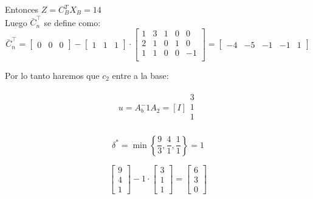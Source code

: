 \documentclass{article}
\begin{document}
\begin{flushleft}
		Entonces $Z = C_B^T X_B = 14$\\

		\vspace{0,5cm}
		Luego \(\bar{C}_n^\intercal\) se define como:
		\begin{equation*}
			\bar{C}_n^\intercal = 
			\begin{bmatrix}
				0 & 0 & 0
			\end{bmatrix} - 
			\begin{bmatrix}
				1 & 1 & 1
			\end{bmatrix} \cdot
			\begin{bmatrix}
				1 & 3 & 1 & 0 & 0  \\
				2 & 1 & 0 & 1 & 0  \\
				1 & 1 & 0 & 0 & -1  \\
			\end{bmatrix} = 
			\begin{bmatrix}
				-4 & -5 & -1 & -1 & 1
			\end{bmatrix}
		\end{equation*}
		\vspace{0,5cm}

		Por lo tanto haremos que $c_2$ entre a la base:

		\vspace{0,5cm}
		\begin{equation*}
			\begin{array}{c}
				u = A_b^-1 A_2 = [I]\begin{array}{c}
					3 \\
					1 \\
					1 \\
				\end{array}
			\end{array}
		\end{equation*}

		\[
		\delta^* = \min \left\{ \frac{9}{3}, \frac{4}{1}, \frac{1}{1} \right\} = 1
		\]
		\vspace{0,5cm}

		\[
		\begin{bmatrix} 9 \\ 4 \\ 1 \end{bmatrix} - 1 \cdot \begin{bmatrix} 3 \\ 1 \\ 1 \end{bmatrix} = \begin{bmatrix} 6 \\ 3 \\ 0 \end{bmatrix}
		\]


\end{flushleft}
\end{document}
